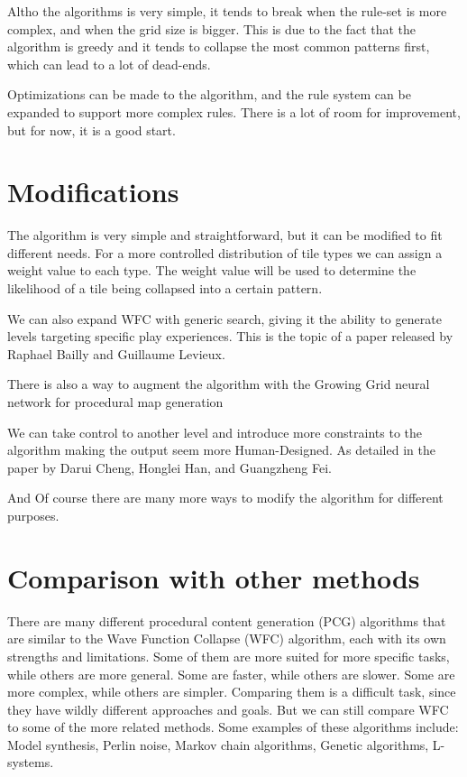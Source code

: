 \documentclass[10pt,oneside,a4paper]{article}
\begin{document}
Altho the algorithms is very simple, it tends to break when the rule-set is more complex, and when the grid size is bigger.
This is due to the fact that the algorithm is greedy and it tends to collapse the most common patterns first, which can lead to a lot of dead-ends.

Optimizations can be made to the algorithm, and the rule system can be expanded to support more complex rules.
There is a lot of room for improvement, but for now, it is a good start.

\section{Modifications}\label{sec:modifications}
The algorithm is very simple and straightforward, but it can be modified to fit different needs.
For a more controlled distribution of tile types we can assign a weight value to each type.
The weight value will be used to determine the likelihood of a tile being collapsed into a certain pattern.

We can also expand WFC with generic search, giving it the ability to generate levels targeting specific play experiences.
This is the topic of a paper released by Raphael Bailly and Guillaume Levieux\cite{BL22}.

There is also a way to augment the algorithm with the Growing Grid neural network for procedural map generation~\cite{NMBP20}

We can take control to another level and introduce more constraints to the algorithm making the output seem more Human-Designed.
As detailed in the paper by Darui Cheng, Honglei Han, and Guangzheng Fei\cite{CHF20}.

And Of course there are many more ways to modify the algorithm for different purposes.

\section{Comparison with other methods}\label{sec:comparison}

There are many different procedural content generation (PCG) algorithms that are similar to the Wave Function Collapse (WFC) algorithm, each with its own strengths and limitations.
Some of them are more suited for more specific tasks, while others are more general.
Some are faster, while others are slower. Some are more complex, while others are simpler.
Comparing them is a difficult task, since they have wildly different approaches and goals.
But we can still compare WFC to some of the more related methods.
Some examples of these algorithms include: Model synthesis, Perlin noise, Markov chain algorithms, Genetic algorithms, L-systems.
\end{document}
